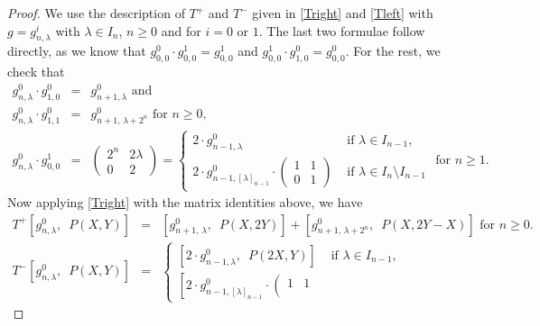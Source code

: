 \documentclass[11pt, reqno]{amsart}
\numberwithin{equation}{section}
\theoremstyle{definition}
\theoremstyle{remark}
\theoremstyle{definition}
\theoremstyle{remark}
\theoremstyle{remark}
\begin{document}
\begin{proof}
We use the description of $T^{+}$ and $T^{-}$ given in \eqref{Tright} and \eqref{Tleft} with $g= g_{n,\lambda}^{i}$ with $\lambda\in I_n$, $n\geq 0$ and for $i=0$ or $1$. The last two formulae follow directly, as we know that $g_{0,0}^0\cdot g_{0,0}^1=g_{0,0}^1$ and $g_{0,0}^1\cdot g_{1,0}^0=g_{0,0}^0$. For the rest, we check that
\begin{eqnarray*}
g_{n,\lambda}^{0}\cdot g_{1,0}^{0} &=& g_{n+1,\lambda}^{0} \text{ and } \\
g_{n,\lambda}^{0}\cdot g_{1,1}^{0} &=& g_{n+1,\,\lambda+2^{n}}^{0} \text{ for } n\geq0,  \\
g_{n,\lambda}^{0} \cdot g_{0,0}^{1} &=& \left(\begin{smallmatrix}
        2^{n} & 2\lambda\\ 
        0 & 2
    \end{smallmatrix}\right)
   =\begin{cases}
    2\cdot g_{n-1,\lambda}^0  & \text{ if } \lambda \in I_{n-1},\\
 2\cdot g_{n-1, [\lambda]_{n-1}}^{0} \cdot \left(\begin{smallmatrix}
        1&1\\
        0&1
    \end{smallmatrix}\right) & \text{ if } \lambda \in I_{n}\setminus I_{n-1}
\end{cases} \text{ for } n\geq1.
  \end{eqnarray*}    
 Now applying \eqref{Tright} with the matrix identities above, we have
 \begin{eqnarray*}
T^{+}\left[g_{n,\lambda}^{0}, \enspace P(X,Y)\right] %
&=& \left[g_{n+1,\,\lambda}^{0},\enspace P(X,2Y)\right] +  \left[g_{n+1,\, \lambda+ 2^n}^{0},\enspace P(X,2Y-X)\right] \text{ for } n\geq0.\\
T^{-}\left[g_{n,\lambda}^{0},\enspace  P(X,Y)\right]&=& %
\begin{cases}
        \left[2\cdot g_{n-1,\lambda}^{0}, \enspace  P(2X,Y) \right] &\text{ if } \lambda \in I_{n-1},\\
        \left[2\cdot g_{n-1,[\lambda]_{n-1}}^{0}\cdot\left(\begin{smallmatrix}
        1&1\\

\end{smallmatrix}
\end{cases}
\end{eqnarray*}
\end{proof}
\end{document}
